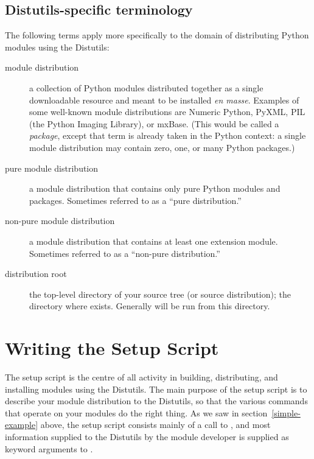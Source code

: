 \documentclass{howto}
\begin{document}
\subsection{Distutils-specific terminology}
\label{distutils-term}

The following terms apply more specifically to the domain of
distributing Python modules using the Distutils:
\begin{description}
\item[module distribution] a collection of Python modules distributed
  together as a single downloadable resource and meant to be installed
  \emph{en masse}.  Examples of some well-known module distributions are
  Numeric Python, PyXML, PIL (the Python Imaging Library), or
  mxBase.  (This would be called a \emph{package}, except that term
  is already taken in the Python context: a single module distribution
  may contain zero, one, or many Python packages.)

\item[pure module distribution] a module distribution that contains only
  pure Python modules and packages.  Sometimes referred to as a ``pure
  distribution.''

\item[non-pure module distribution] a module distribution that contains
  at least one extension module.  Sometimes referred to as a ``non-pure
  distribution.''

\item[distribution root] the top-level directory of your source tree (or 
  source distribution); the directory where  exists.  Generally 
   will be run from this directory.
\end{description}


\section{Writing the Setup Script}
\label{setup-script}

The setup script is the centre of all activity in building,
distributing, and installing modules using the Distutils.  The main
purpose of the setup script is to describe your module distribution to
the Distutils, so that the various commands that operate on your modules
do the right thing.  As we saw in section~\ref{simple-example} above,
the setup script consists mainly of a call to , and
most information supplied to the Distutils by the module developer is
supplied as keyword arguments to .
\end{document}
